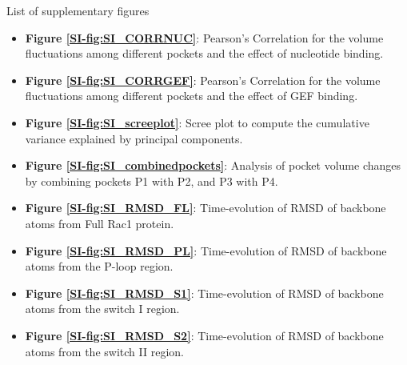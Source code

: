 \documentclass[12pt, a4paper]{achemso}
\begin{document}
\begin{suppinfo}

List of supplementary figures
\begin{itemize}
    \item \textbf{Figure \ref{SI-fig:SI_CORRNUC}}: Pearson's Correlation for the volume fluctuations among different pockets and the effect of nucleotide binding.
    \item \textbf{Figure \ref{SI-fig:SI_CORRGEF}}: Pearson's Correlation for the volume fluctuations among different pockets and the effect of GEF binding.
    \item \textbf{Figure \ref{SI-fig:SI_screeplot}}: Scree plot to compute the cumulative variance explained by principal components.
    \item \textbf{Figure \ref{SI-fig:SI_combinedpockets}}: Analysis of pocket volume changes by combining pockets P1 with P2, and P3 with P4.
    \item \textbf{Figure \ref{SI-fig:SI_RMSD_FL}}: Time-evolution of RMSD of backbone atoms from Full Rac1 protein.
    \item \textbf{Figure \ref {SI-fig:SI_RMSD_PL}}: Time-evolution of RMSD of backbone atoms from the P-loop region.
    \item \textbf{Figure \ref{SI-fig:SI_RMSD_S1}}: Time-evolution of RMSD of backbone atoms from the switch I region.
    \item \textbf{Figure \ref{SI-fig:SI_RMSD_S2}}: Time-evolution of RMSD of backbone atoms from the switch II region.
\end{itemize}
\end{suppinfo}

 
\end{document}
